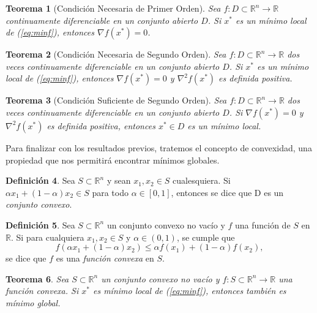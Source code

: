\documentclass[11pt,a4paper]{book}
\newtheorem{theorem}{Teorema}[chapter]
\theoremstyle{definition}
\newtheorem{definition}[theorem]{Definición}
\theoremstyle{remark}
\begin{document}
\begin{theorem}[Condición Necesaria de Primer Orden]
	Sea $f:D\subset \mathbb{R}^n \rightarrow \mathbb{R}$ continuamente diferenciable en un
	conjunto abierto $D$. Si $x^*$ es un mínimo local de (\ref{eq:minf}), entonces
	$\nabla f(x^*) = 0$.
\end{theorem}

\begin{theorem}
	[Condición Necesaria de Segundo Orden]
	Sea $f:D\subset \mathbb{R}^n \rightarrow \mathbb{R}$ dos veces continuamente diferenciable
	en un conjunto abierto $D$. Si $x^*$ es un mínimo local de (\ref{eq:minf}), entonces
	$\nabla f(x^*) = 0$ y $\nabla^2 f(x^*)$ es definida positiva.
\end{theorem}

\begin{theorem}[Condición Suficiente de Segundo Orden]
	Sea $f:D\subset \mathbb{R}^n \rightarrow \mathbb{R}$ dos veces continuamente diferenciable
	en un conjunto abierto $D$. Si $\nabla f(x^*) = 0$ y $\nabla^2 f(x^*)$ es definida positiva,
	entonces $x^* \in D$ es un mínimo local.
\end{theorem}

Para finalizar con los resultados previos, tratemos el concepto de convexidad, una propiedad
que nos permitirá encontrar mínimos globales.

\begin{definition}
	Sea $S\subset \mathbb{R}^n$ y sean $x_1, x_2 \in S$ cualesquiera. Si
	$\alpha x_1 + (1 - \alpha)x_2 \in S$ para todo $\alpha \in [0,1]$, entonces se dice que D
	es un \textit{conjunto convexo}.
\end{definition}
\begin{definition}
	Sea $S \subset \mathbb{R}^n$ un conjunto convexo no vacío y $f$ una función de $S$ en $\mathbb{R}$. Si para cualquiera $x_1, x_2 \in S$ y
	$\alpha \in (0,1)$, se cumple que
	\begin{equation}
		f(\alpha x_1 + (1-\alpha)x_2) \leq \alpha f(x_1) + (1-\alpha)f(x_2),
	\end{equation}
	se dice que $f$ es una \textit{función convexa} en $S$.
\end{definition}

\begin{theorem}
	Sea $S \subset \mathbb{R}^n$ un conjunto convexo no vacío y
	$f:S \subset \mathbb{R}^n \rightarrow \mathbb{R}$ una función convexa. Si $x^*$ es mínimo
	local de (\ref{eq:minf}), entonces también es mínimo global.
\end{theorem}
\end{document}

